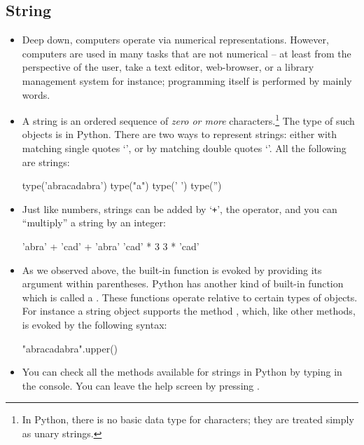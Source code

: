 \documentclass[a4paper]{article}
\begin{document}
\subsection{String}

\begin{itemize}

\item Deep down, computers operate via numerical representations. However,
computers are used in many tasks that are not numerical -- at least from the
perspective of the user, take a text editor, web-browser, or a library
management system for instance; programming itself is performed by mainly words. 

\item A string is an ordered sequence of \emph{zero
or more} characters.\footnote{In Python, there is no basic data type for
characters; they are treated simply as unary strings.} The type of such objects
is  in Python. There are two ways to
represent strings: either with matching single quotes `', or by matching
double quotes `'.  All the following are
strings:

\begin{ucodeframe}
\begin{pyconsole}
type('abracadabra')
type("a")
type(' ')
type('')
\end{pyconsole}
\end{ucodeframe}

\item Just like numbers, strings can be added by `\Verb|+|', the
 operator, and you can ``multiply'' a string by an integer:

\begin{ucodeframe}
\begin{pyconsole}
'abra' + 'cad' + 'abra'
'cad' * 3
3 * 'cad'
\end{pyconsole}
\end{ucodeframe}


\item As we observed above, the built-in function  is evoked by
providing its argument within parentheses. Python has another kind of built-in
function which is called a . These functions operate relative to certain types of objects. For
instance a string object supports the method ,
which, like other methods, is evoked by the following syntax:

\begin{ucodeframe}
\begin{pyconsole}
"abracadabra".upper()
\end{pyconsole}
\end{ucodeframe}

\item You can check all the methods available for strings in Python by typing
 in the console. You can leave the help screen by pressing
.



\end{itemize}
\end{document}
